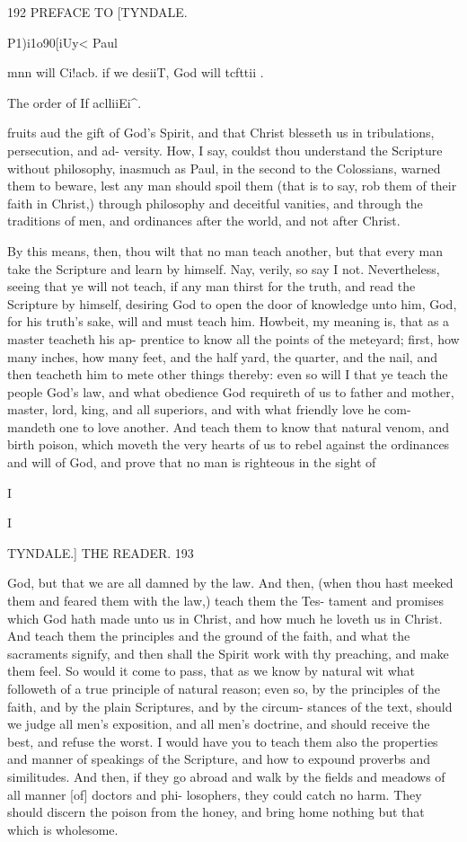 \documentclass{custom}
\begin{document}
192 
PREFACE TO 
[TYNDALE.

P1)i1o90[iUy< 
Paul 

mnn will 
Ci!acb. if we 
desiiT, God 
will tcfttii . 

The order 
of If aclliiEi^. 

fruits aud the gift of God's Spirit, and that Christ 
blesseth us in tribulations, persecution, and ad- 
versity. How, I say, couldst thou understand 
the Scripture without philosophy, inasmuch as 
Paul, in the second to the Colossians, warned 
them to beware, lest any man should spoil them 
(that is to say, rob them of their faith in Christ,) 
through philosophy and deceitful vanities, and 
through the traditions of men, and ordinances 
after the world, and not after Christ. 

By this means, then, thou wilt that no man 
teach another, but that every man take the 
Scripture and learn by himself. Nay, verily, so 
say I not. Nevertheless, seeing that ye will not 
teach, if any man thirst for the truth, and read 
the Scripture by himself, desiring God to open 
the door of knowledge unto him, God, for his 
truth's sake, will and must teach him. Howbeit, 
my meaning is, that as a master teacheth his ap- 
prentice to know all the points of the meteyard; 
first, how many inches, how many feet, and the 
half yard, the quarter, and the nail, and then 
teacheth him to mete other things thereby: even 
so will I that ye teach the people God's law, 
and what obedience God requireth of us to 
father and mother, master, lord, king, and all 
superiors, and with what friendly love he com- 
mandeth one to love another. And teach them 
to know that natural venom, and birth poison, 
which moveth the very hearts of us to rebel 
against the ordinances and will of God, and 
prove that no man is righteous in the sight of 

I 

I 


TYNDALE.]
THE READER.
193

God, but that we are all damned by the law. 
And then, (when thou hast meeked them and 
feared them with the law,) teach them the Tes- 
tament and promises which God hath made unto 
us in Christ, and how much he loveth us in 
Christ. And teach them the principles and the 
ground of the faith, and what the sacraments 
signify, and then shall the Spirit work with thy 
preaching, and make them feel. So would it 
come to pass, that as we know by natural wit 
what followeth of a true principle of natural 
reason; even so, by the principles of the faith, 
and by the plain Scriptures, and by the circum- 
stances of the text, should we judge all men's 
exposition, and all men's doctrine, and should 
receive the best, and refuse the worst. I would 
have you to teach them also the properties and 
manner of speakings of the Scripture, and how 
to expound proverbs and similitudes. And 
then, if they go abroad and walk by the fields 
and meadows of all manner [of] doctors and phi- 
losophers, they could catch no harm. They 
should discern the poison from the honey, and 
bring home nothing but that which is wholesome. 
\end{document}

